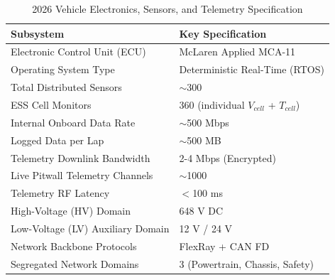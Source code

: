 \begin{table}[H]
\centering
\caption{2026 Vehicle Electronics, Sensors, and Telemetry Specification}
\vspace{0.2cm}
\begin{tabularx}{\textwidth}{@{}XX@{}}
\toprule
\textbf{Subsystem} & \textbf{Key Specification} \\
\midrule
Electronic Control Unit (ECU) & McLaren Applied MCA-11 \\
Operating System Type & Deterministic Real-Time (RTOS) \\
Total Distributed Sensors & $\sim$300 \\
ESS Cell Monitors & 360 (individual $V_{cell}$ + $T_{cell}$) \\
Internal Onboard Data Rate & $\sim$500 Mbps \\
Logged Data per Lap & $\sim$500 MB \\
Telemetry Downlink Bandwidth & 2-4 Mbps (Encrypted) \\
Live Pitwall Telemetry Channels & $\sim$1000 \\
Telemetry RF Latency & $<$100 ms \\
High-Voltage (HV) Domain & 648 V DC \\
Low-Voltage (LV) Auxiliary Domain & 12 V / 24 V \\
Network Backbone Protocols & FlexRay + CAN FD \\
Segregated Network Domains & 3 (Powertrain, Chassis, Safety) \\
\bottomrule
\end{tabularx}
\label{tab:electronics_params}
\end{table}

